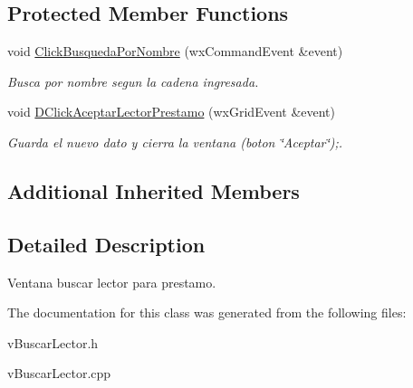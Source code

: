 \subsection*{Protected Member Functions}
\begin{DoxyCompactItemize}
\item 
void \hyperlink{classv_buscar_lector_af4f26568235cb509e3dda02aa9acfb93}{Click\+Busqueda\+Por\+Nombre} (wx\+Command\+Event \&event)\hypertarget{classv_buscar_lector_af4f26568235cb509e3dda02aa9acfb93}{}\label{classv_buscar_lector_af4f26568235cb509e3dda02aa9acfb93}

\begin{DoxyCompactList}\small\item\em Busca por nombre segun la cadena ingresada. \end{DoxyCompactList}\item 
void \hyperlink{classv_buscar_lector_a2049afb7b506b281493435a9f992f972}{D\+Click\+Aceptar\+Lector\+Prestamo} (wx\+Grid\+Event \&event)\hypertarget{classv_buscar_lector_a2049afb7b506b281493435a9f992f972}{}\label{classv_buscar_lector_a2049afb7b506b281493435a9f992f972}

\begin{DoxyCompactList}\small\item\em Guarda el nuevo dato y cierra la ventana (boton \char`\"{}\+Aceptar\char`\"{});. \end{DoxyCompactList}\end{DoxyCompactItemize}
\subsection*{Additional Inherited Members}


\subsection{Detailed Description}
Ventana buscar lector para prestamo. 

The documentation for this class was generated from the following files\+:\begin{DoxyCompactItemize}
\item 
v\+Buscar\+Lector.\+h\item 
v\+Buscar\+Lector.\+cpp\end{DoxyCompactItemize}
